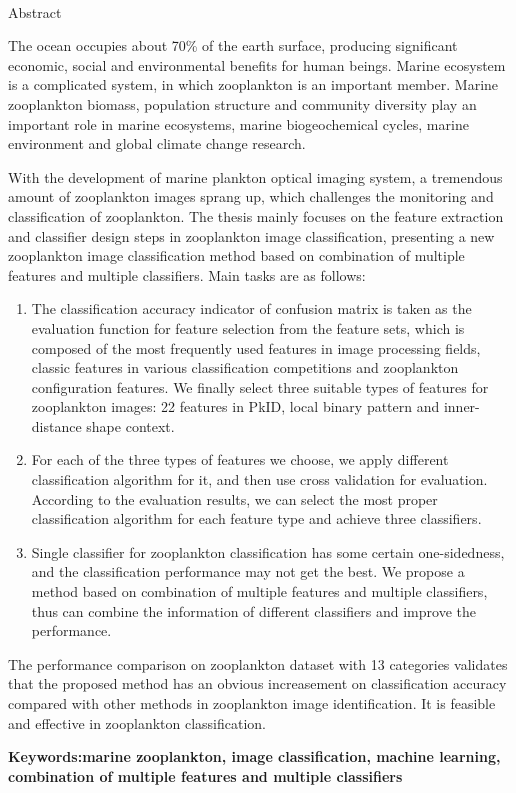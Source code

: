 \begin{center}
  {\sanhao[1.5]\heiti\oucetitle\\\vskip7pt Abstract}
\end{center}
{\normalsize\songti

The ocean occupies about 70\% of the earth surface, producing significant economic, social and environmental benefits for human beings. Marine ecosystem is a complicated system,  in which zooplankton is an important member. Marine zooplankton biomass, population structure and community diversity play an important role in marine ecosystems, marine biogeochemical cycles, marine environment and global climate change research.

With the development of marine plankton optical imaging system, a tremendous amount of zooplankton images sprang up, which challenges the monitoring and classification of zooplankton. The thesis mainly focuses on the feature extraction and classifier design steps in zooplankton image classification, presenting a new zooplankton image classification method based on combination of multiple features and multiple classifiers.  Main tasks are as follows:

\begin{enumerate}
\item The classification accuracy indicator of confusion matrix is taken as the evaluation function for feature selection from the feature sets, which is composed of the most frequently used features in image processing fields, classic features in various classification competitions and zooplankton configuration features. We finally select three suitable types of features for zooplankton images: 22 features in PkID, local binary pattern and inner-distance shape context.
\item For each of the three types of features we choose, we apply different classification algorithm for it, and then use cross validation for evaluation. According to the evaluation results, we can select the most proper classification algorithm for each feature type and achieve three classifiers.
\item Single classifier for zooplankton classification has some certain one-sidedness, and the classification performance may not get the best. We propose a method based on combination of multiple features and multiple classifiers, thus can combine the information of different classifiers and improve the performance.
\end{enumerate}

The performance comparison on zooplankton dataset with 13 categories validates that the proposed method has an obvious increasement on classification accuracy compared with other methods in zooplankton image identification. It is feasible and effective in zooplankton classification.
}
\vskip12bp
{\xiaosi\heiti\noindent 
\textbf{Keywords:\enskip marine zooplankton, image classification, machine learning, combination of multiple features and multiple classifiers}}
